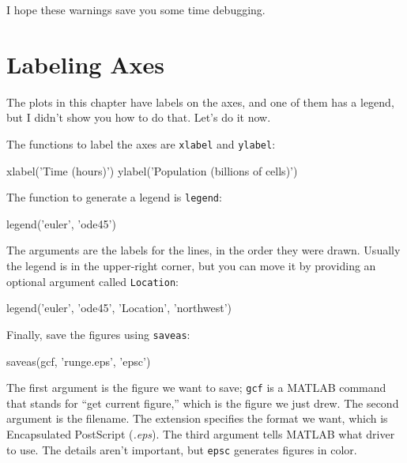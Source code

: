 I hope these warnings save you some time debugging.

\section{Labeling Axes}

The plots in this chapter have labels on the axes, and one of them has a legend, but I didn't show you how to do that.  Let's do it now.


The functions to label the axes are \lstinline{xlabel} and \lstinline{ylabel}:

\begin{code}
xlabel('Time (hours)')
ylabel('Population (billions of cells)')
\end{code}

The function to generate a legend is \lstinline{legend}:

\begin{code}
legend('euler', 'ode45')
\end{code}


The arguments are the labels for the lines, in the order they were drawn.  Usually the legend is in the upper-right corner, but you can move it by providing an optional argument called \lstinline{Location}:

\begin{code}
legend('euler', 'ode45', 'Location', 'northwest')
\end{code}

Finally,  save the figures using \lstinline{saveas}:

\begin{code}
saveas(gcf, 'runge.eps', 'epsc')
\end{code}

The first argument is the figure we want to save; \lstinline{gcf} is a MATLAB command that stands for ``get current figure,'' which is the figure we just drew.  The second argument is the filename.  The extension specifies the format we want, which is Encapsulated PostScript (\emph{.eps}).  The third argument tells MATLAB what driver to use.  The details aren't important, but \lstinline{epsc} generates figures in color.


